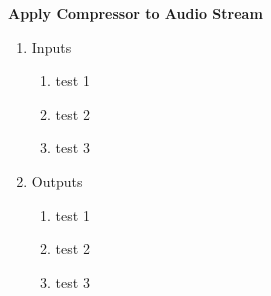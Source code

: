 \item \textbf{Apply Compressor to Audio Stream}

\begin{enumerate}
	\item Inputs
	\begin{enumerate}
		\item test 1
		\item test 2
		\item test 3
	\end{enumerate}


	\item Outputs
	\begin{enumerate}
		\item test 1
		\item test 2
		\item test 3
	\end{enumerate}	


\end{enumerate}